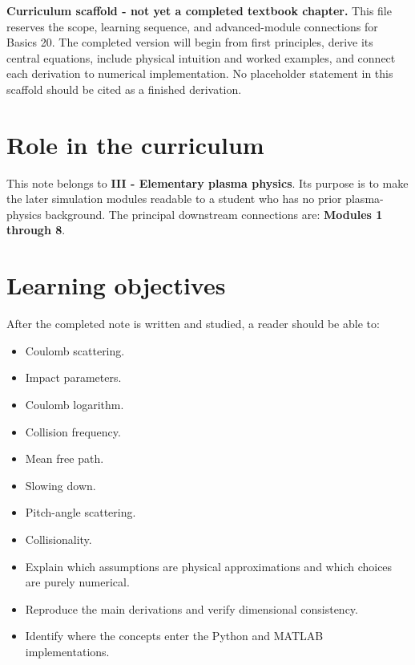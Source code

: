 \documentclass[11pt]{article}
\begin{document}

\begin{overviewbox}
\textbf{Curriculum scaffold - not yet a completed textbook chapter.} This file reserves the scope, learning sequence, and advanced-module connections for Basics 20. The completed version will begin from first principles, derive its central equations, include physical intuition and worked examples, and connect each derivation to numerical implementation. No placeholder statement in this scaffold should be cited as a finished derivation.
\end{overviewbox}

\ProjectTOC

\section{Role in the curriculum}
This note belongs to \textbf{III - Elementary plasma physics}. Its purpose is to make the later simulation modules readable to a student who has no prior plasma-physics background. The principal downstream connections are: \textbf{Modules 1 through 8}.

\section{Learning objectives}
After the completed note is written and studied, a reader should be able to:
\begin{itemize}[leftmargin=1.6em]
\item Coulomb scattering.
\item Impact parameters.
\item Coulomb logarithm.
\item Collision frequency.
\item Mean free path.
\item Slowing down.
\item Pitch-angle scattering.
\item Collisionality.
\item Explain which assumptions are physical approximations and which choices are purely numerical.
\item Reproduce the main derivations and verify dimensional consistency.
\item Identify where the concepts enter the Python and MATLAB implementations.
\end{itemize}
\end{document}
